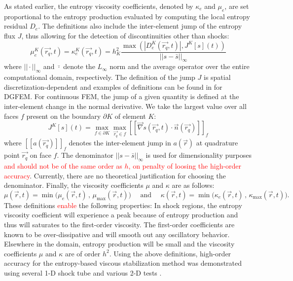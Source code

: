 \documentclass[preprint,10pt]{elsarticle}
\newcommand{\grad}{\vec{\nabla}}
\newcommand{\jmp}[1]{[\![#1]\!]}                     %
\newcommand{\tcr}[1]{\textcolor{red}{#1}}
\begin{document}
As stated earlier, the entropy viscosity coefficients, denoted by $\kappa_e$ and $\mu_e$, are set proportional to the entropy production evaluated by computing the local entropy residual $D_e$. The definitions also include the inter-element jump of the entropy flux $J$, thus allowing for the detection of discontinuities other than shocks:
%
\begin{equation}
\label{eq:ent_visc_coeff}
\mu^K_e(\vec{r_q},t) = \kappa^K_e(\vec{r_q},t) = h_K^2 \frac{\max\left( | D^K_e(\vec{r_q},t) |, J^K[s](t) \right)}{|| s - \bar{s} ||_{\infty}} 
\end{equation}
%
where $|| \cdot ||_{\infty}$ and $\bar{\cdot}$ denote the $L_\infty$ norm and the average operator over the entire computational domain, respectively. The definition of the jump $J$ is spatial discretization-dependent and examples of definitions can be found in \cite{valentin} for DGFEM. For continuous FEM, the jump of a given quantity is defined at the inter-element change in the normal derivative. We take the largest value over all faces $f$ present on the boundary $\partial K$ of element $K$:
%
\begin{equation}
\label{eq:jump_CFEM}
J^K[s](t) = \max_{f\in\partial K}  \max_{\vec{r_q} \in f} \jmp{\grad s(\vec{r_q},t) \cdot \vec{n}(\vec{r_q}) }_f
\end{equation}
%
where $\jmp{a(\vec{r_q})}_f$ denotes the inter-element jump in $a(\vec{r})$ at quadrature point $\vec{r_q}$ on face $f$.  
The denominator $|| s - \bar{s} ||_{\infty}$ is used for dimensionality purposes \tcr{and should not be of the same order as $h$, on penalty of loosing the high-order accuracy}. Currently, there are no theoretical justification for choosing the denominator. 
Finally, the viscosity coefficients $\mu$ and $\kappa$ are as follows:
%
\begin{equation}
\mu(\vec{r},t)    = \min\Big( \mu_e(\vec{r},t)   \,,\, \mu_{\max}(\vec{r},t)    \Big) 
\quad \text{ and } \quad 
\kappa(\vec{r},t) = \min\Big( \kappa_e(\vec{r},t)\,,\, \kappa_{\max}(\vec{r},t) \Big).
\end{equation}
%
These definitions \tcr{enable} the following properties: 
In shock regions, the entropy viscosity coefficient will experience a peak because of entropy production and thus will saturates to the first-order viscosity. The first-order coefficients are known to be over-dissipative and will smooth out any oscillatory behavior. Elsewhere in the domain, entropy production will be small and the viscosity coefficients $\mu$ and $\kappa$ are of order $h^2$.
Using the above definitions, high-order accuracy for the entropy-based viscous stabilization method was demonstrated using several 1-D shock tube and various 2-D tests \cite{jlg1, jlg2, valentin}.
\end{document}
